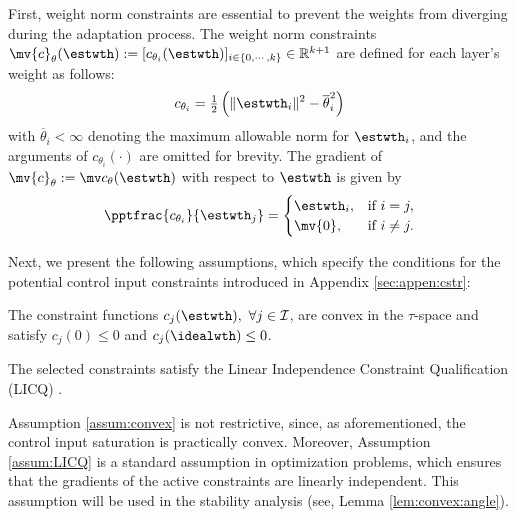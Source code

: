 \documentclass[journal]{IEEEtran}
\begin{document}
First, weight norm constraints are essential to prevent the weights from diverging during the adaptation process.
The weight norm constraints $\mv{c}_{\theta}(\estwth):= [c_{\theta_i}(\estwth)]_{i\in\{0,\cdots ,k\}}\in\mathbb R^{k+1}$ are defined for each layer's weight as follows:
\begin{equation}
    c_{\theta_i}
    =
    \tfrac{1}{2}
    \left(
        \Vert \estwth_i\Vert^2 
        -
        \overline\theta_i^2 
    \right)    
    \label{eq:cstr:weight:ball}
\end{equation}
with $\overline\theta_i<\infty$ denoting the maximum allowable norm for $\estwth_i$, and the arguments of $c_{\theta_i}(\cdot)$ are omitted for brevity.
The gradient of $\mv{c}_\theta:=\mv c_{\theta}(\estwth)$ with respect to $\estwth$ is given by
\begin{equation}
    \pptfrac{c_{\theta_i}}{\estwth_j} 
    =
    \begin{cases}
        \estwth_i,
        &
        \text{if } i=j,
        \\
        \mv{0},
        &
        \text{if } i\ne j
        .
    \end{cases} 
    \label{eq:cstr:weight:ball:grad}
\end{equation}

Next, we present the following assumptions, which specify the conditions for the potential control input constraints introduced in Appendix \ref{sec:appen:cstr}:

\begin{assum}
    The constraint functions $c_j(\estwth),\ \forall j\in\mathcal I$, are convex in the $\tau$-space and satisfy $c_j(0) \le 0$ and $c_j(\idealwth)\le 0$.
    \label{assum:convex}
\end{assum}

\begin{assum}
    The selected constraints satisfy the Linear Independence Constraint Qualification (LICQ) \cite[Chap.~12 Def.~12.1]{Nocedal:2006aa}.
    \label{assum:LICQ}
\end{assum}

\begin{remark}
    Assumption \ref{assum:convex} is not restrictive, since, as aforementioned, the control input saturation is practically convex.
    Moreover, Assumption \ref{assum:LICQ} is a standard assumption in optimization problems, which ensures that the gradients of the active constraints are linearly independent.
    This assumption will be used in the stability analysis (see, Lemma \ref{lem:convex:angle}).
\end{remark}
\end{document}
